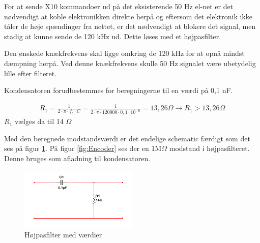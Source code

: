 For at sende X10 kommandoer ud på det eksisterende 50 Hz el-net er det nødvendigt at koble elektronikken direkte herpå og eftersom det elektronik ikke tåler de høje spændinger fra nettet, er det nødvendigt at blokere det signal, men stadig at kunne sende de 120 kHz ud. Dette løses med et højpasfilter.

Den ønskede knækfrekvens skal ligge omkring de 120 kHz for at opnå mindst dæmpning herpå. Ved denne knækfrekvens skulle 50 Hz signalet være ubetydelig lille efter filteret. 

Kondensatoren forudbestemmes for beregningerne til en værdi på 0,1 nF.

\begin{align}
R_1 = \frac{1}{2 \cdot \pi \cdot f_c \cdot C } = \frac{1}{2 \cdot \pi \cdot 120000 \cdot 0,1 \cdot 10^{-6}} = 13,26 \Omega
\rightarrow R_1 > 13,26 \Omega
\end{align}
$R_1$ vælges da til 14 $\Omega$

Med den beregnede modstandsværdi er det endelige schematic færdigt som det ses på figur \ref{fig:HP_MV}. På figur \ref{fig:Encoder} ses der en 1M$\Omega$ modstand i højpasfilteret. Denne bruges som afladning til kondensatoren.

\begin{figure}[htbp]
	\centering
	\includegraphics[width=0.50\textwidth]{billeder/HWdesign/HP_MV.png}
	\caption{Højpasfilter med værdier}
	\label{fig:HP_MV}
\end{figure}

\newpage
  
